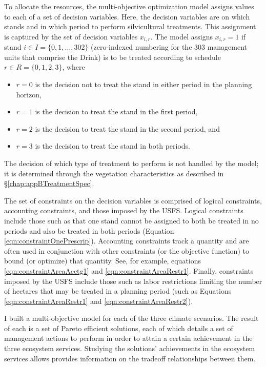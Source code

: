 To allocate the resources, the multi-objective optimization model assigns values to each of a set of decision variables. Here, the decision variables are on which stands and in which period to perform silvicultural treatments. This assignment is captured by the set of decision variables $x_{i,r}$. The model assigns $x_{i,r} = 1$ if stand $i \in I = \{0,1,\ldots,302\}$ (zero-indexed numbering for the 303 management units that comprise the Drink) is to be treated according to schedule $r \in R = \{0,1,2,3\}$, where
\begin{itemize}
\item $r = 0$ is the decision not to treat the stand in either period in the planning horizon,\item $r = 1$ is the decision to treat the stand in the first period,
\item $r = 2$ is the decision to treat the stand in the second period, and
\item $r = 3$ is the decision to treat the stand in both periods.
\end{itemize}
The decision of which type of treatment to perform is not handled by the model; it is determined through the vegetation characteristics as described in \S \ref{chap:appBTreatmentSpec}.

The set of constraints on the decision variables is comprised of logical constraints, accounting constraints, and those imposed by the USFS. Logical constraints include those such as that one stand cannot be assigned to both be treated in no periods and also be treated in both periods (Equation \ref{eqn:constraintOnePrescrip}). Accounting constraints track a quantity and are often used in conjunction with other constraints (or the objective function) to bound (or optimize) that quantity. See, for example, equations \ref{eqn:constraintAreaAcctg1} and \ref{eqn:constraintAreaRestr1}. Finally, constraints imposed by the USFS include those such as labor restrictions limiting the number of hectares that may be treated in a planning period (such as Equations \ref{eqn:constraintAreaRestr1} and \ref{eqn:constraintAreaRestr2}).

I built a multi-objective model for each of the three climate scenarios. The result of each is a set of Pareto efficient solutions, each of which details a set of management actions to perform in order to attain a certain achievement in the three ecosystem services. Studying the solutions' achievements in the ecosystem services allows provides information on the tradeoff relationships between them.

